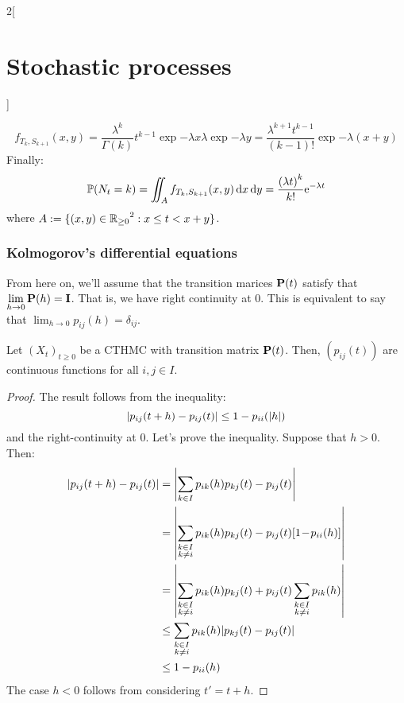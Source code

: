 \documentclass[../../../main_math.tex]{subfiles}
\begin{document}
\begin{multicols}{2}[\section{Stochastic processes}]
\begin{sproof}
    $$
      f_{T_k,S_{k+1}}(x,y)=\frac{\lambda^k}{\Gamma(k)}t^{k-1}\exp{-\lambda x}\lambda \exp{-\lambda y}=\frac{\lambda^{k+1}t^{k-1}}{(k-1)!}\exp{-\lambda (x+y)}
    $$
    Finally:
    $$
      \mathbb{P}(N_t=k)=\iint_{A}f_{T_k,S_{k+1}}(x,y) \dd{x}\dd{y}=\frac{{(\lambda t)}^k}{k!}\mathrm{e}^{-\lambda t}
    $$
    where $A:=\{(x,y)\in{\ensuremath{\mathbb{R}}_{\geq 0}}^2: x\leq t< x+y\}$.
  \end{sproof}
  \subsubsection{Kolmogorov's differential equations}
  From here on, we'll assume that the transition marices $\boldsymbol{\mathrm{P}}(t)$ satisfy that $\displaystyle\lim_{h\to 0} \boldsymbol{\mathrm{P}} (h)=\boldsymbol{\mathrm{I}}$. That is, we have right continuity at $0$. This is equivalent to say that $\displaystyle\lim_{h\to 0} p_{ij}(h)=\delta_{ij}$.
  \begin{lemma}
    Let ${(X_t)}_{t\geq 0}$ be a CTHMC with transition matrix $\boldsymbol{\mathrm{P}}(t)$. Then, $(p_{ij}(t))$ are continuous functions for all $i,j\in I$.
  \end{lemma}
  \begin{proof}
    The result follows from the inequality:
    $$
      \abs{p_{ij}(t+h) - p_{ij}(t)}\leq 1-p_{ii}(\abs{h})
    $$
    and the right-continuity at 0. Let's prove the inequality. Suppose that $h>0$. Then:
    \begin{align*}
      \abs{p_{ij}(t+h) - p_{ij}(t)} & = \abs{\sum_{k\in I} p_{ik}(h)p_{kj}(t)-p_{ij}(t)} \\
                                    & =\abs{\sum_{\substack{k \in I                      \\ k\neq i}} p_{ik}(h)p_{kj}(t)-p_{ij}(t)[1\! -\! p_{ii}(h)]}\\
                                    & =\abs{\sum_{\substack{k \in I                      \\ k\neq i}} p_{ik}(h)p_{kj}(t)+p_{ij}(t)\sum_{\substack{k \in I\\ k\neq i}}p_{ik}(h)}\\
                                    & \leq \sum_{\substack{k \in I                       \\ k\neq i}} p_{ik}(h)\abs{p_{kj}(t)-p_{ij}(t)}\\
                                    & \leq 1-p_{ii}(h)
    \end{align*}
    The case $h<0$ follows from considering $t'=t+h$.
  \end{proof}
  \begin{theorem}

\end{theorem}
\end{multicols}
\end{document}
